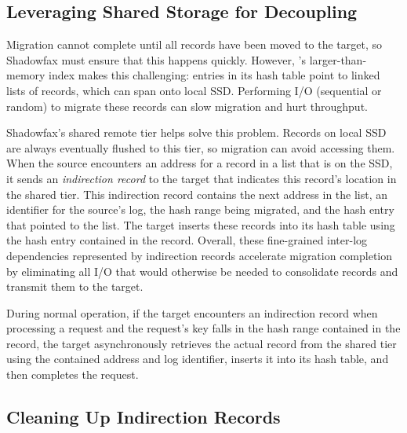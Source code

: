 
\subsection{Leveraging Shared Storage for Decoupling}
\label{sec:design:indirection}

Migration cannot complete until all records have been
moved to the target, so Shadowfax must ensure that this
happens quickly.
%
However, \faster's larger-than-memory index makes this challenging:
entries in its hash table point to linked lists of records, which can
span onto local SSD.
%
Performing I/O (sequential or random) to migrate these records
can slow migration and hurt throughput.

Shadowfax's shared remote tier helps solve this problem.
%
Records on local SSD are always eventually flushed to this tier, so migration
can avoid accessing them.
%
When the source encounters an address for a record in a list that is on the
SSD, it sends an \emph{indirection record} to the target that indicates this
record's location in the shared tier.
%
This indirection record contains the next address in the list, an identifier for the
source's log, the hash range being migrated, and the hash entry that
pointed to the list.
%
The target inserts these records into its hash table using the hash
entry contained in the record.
%
%
Overall, these fine-grained inter-log dependencies represented by indirection
records accelerate migration completion by eliminating all I/O
that would otherwise be needed to consolidate records and transmit them
to the target.

During normal operation, if the target encounters an indirection record
when processing a request and the request's key falls in the
hash range contained in the record, the target asynchronously retrieves
the actual record from the
shared tier using the contained address and log identifier, inserts it
into its hash table, and then completes the request.

\subsection{Cleaning Up Indirection Records}

